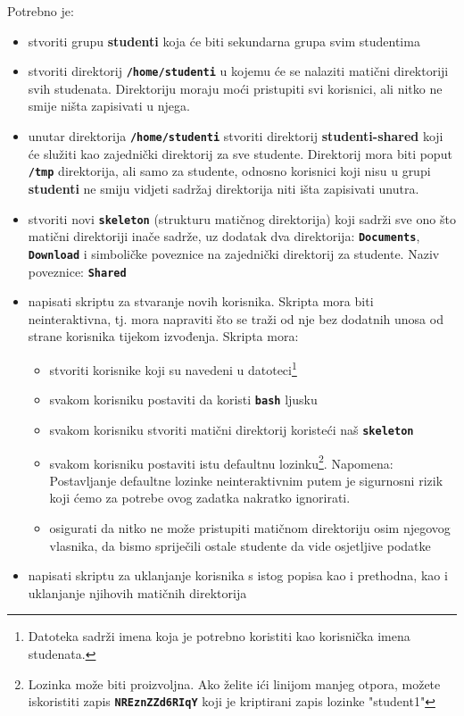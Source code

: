 \documentclass[12pt,a4paper]{article}
\newcommand{\shell}[1]{\texttt{\textbf{#1}}}
\begin{document}
\noindent Potrebno je:
\begin{itemize}
  \item stvoriti grupu \textbf{studenti} koja će biti sekundarna grupa svim studentima
\item stvoriti direktorij \shell{/home/studenti} u kojemu će se nalaziti matični direktoriji svih studenata. Direktoriju moraju moći pristupiti svi korisnici, ali nitko ne smije ništa zapisivati u njega.
\item unutar direktorija \shell{/home/studenti} stvoriti direktorij \textbf{studenti-shared} koji će služiti kao zajednički direktorij za sve studente. Direktorij mora biti poput \shell{/tmp} direktorija, ali samo za studente, odnosno korisnici koji nisu u grupi \textbf{studenti} ne smiju vidjeti sadržaj direktorija niti išta zapisivati unutra.
\item stvoriti novi \shell{skeleton} (strukturu matičnog direktorija) koji sadrži sve ono što matični direktoriji inače sadrže, uz dodatak dva direktorija: \shell{Documents}, \shell{Download} i simboličke poveznice na zajednički direktorij za studente. Naziv poveznice: \shell{Shared}
    \item napisati skriptu za stvaranje novih korisnika. Skripta mora biti neinteraktivna, tj. mora napraviti što se traži od nje bez dodatnih unosa od strane korisnika tijekom izvođenja. Skripta mora:
      \begin{itemize}
    \item stvoriti korisnike koji su navedeni u datoteci\footnote{Datoteka sadrži imena koja je potrebno koristiti kao korisnička imena studenata.}
    \item svakom korisniku postaviti da koristi \shell{bash} ljusku
    \item svakom korisniku stvoriti matični direktorij koristeći naš \shell{skeleton}
    \item svakom korisniku postaviti istu defaultnu lozinku\footnote{Lozinka može biti proizvoljna. Ako želite ići linijom manjeg otpora, možete iskoristiti zapis \shell{NREznZZd6RIqY} koji je kriptirani zapis lozinke "student1"}. Napomena: Postavljanje defaultne lozinke neinteraktivnim putem je sigurnosni rizik koji ćemo za potrebe ovog zadatka nakratko ignorirati.
    \item osigurati da nitko ne može pristupiti matičnom direktoriju osim njegovog vlasnika, da bismo spriječili ostale studente da vide osjetljive podatke 
      \end{itemize}
    \item napisati skriptu za uklanjanje korisnika s istog popisa kao i prethodna, kao i uklanjanje njihovih matičnih direktorija
\end{itemize}
\end{document}
